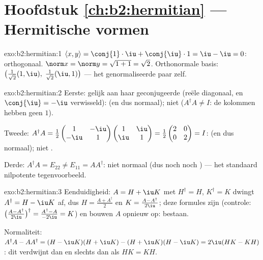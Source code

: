 \section*{Hoofdstuk \ref{ch:b2:hermitian} --- Hermitische vormen}

\begin{solution}{exo:b2:hermitian:1}
$\langle x, y\rangle = \conj{1}\cdot\iu + \conj{\iu}\cdot 1 = \iu -
\iu = 0$: orthogonaal. $\norm x = \norm y = \sqrt{1 + 1} =
\sqrt2$. Orthonormale basis: $\bigl(\frac{1}{\sqrt2}(1, \iu),\;
\frac{1}{\sqrt2}(\iu, 1)\bigr)$ --- het genormaliseerde paar zelf.
\end{solution}

\begin{solution}{exo:b2:hermitian:2}
Eerste: gelijk aan haar geconjugeerde  (reële
diagonaal, en $\conj{\iu} = -\iu$ verwisseld):  (en dus
normaal); niet  ($A^\dagger A \neq I$: de kolommen hebben
geen  $1$).

Tweede: $A^\dagger A = \frac12\begin{pmatrix} 1 & -\iu\\ -\iu &
1\end{pmatrix}\begin{pmatrix} 1 & \iu\\ \iu & 1\end{pmatrix} =
\frac12\begin{pmatrix} 2 & 0\\ 0 & 2\end{pmatrix} = I$:  (en
dus normaal); niet .

Derde: $A^\dagger A = E_{22} \neq E_{11} = AA^\dagger$: niet
normaal (dus noch  noch ) --- het standaard
nilpotente tegenvoorbeeld.
\end{solution}

\begin{solution}{exo:b2:hermitian:3}
Eenduidigheid: $A = H + \iu K$ met $H^\dagger = H$, $K^\dagger = K$
dwingt $A^\dagger = H - \iu K$ af, dus $H = \frac{A +
A^\dagger}{2}$ en $K = \frac{A - A^\dagger}{2\iu}$; deze formules
zijn  (controle: $\bigl(\frac{A -
A^\dagger}{2\iu}\bigr)^\dagger = \frac{A^\dagger - A}{-2\iu} = K$)
en bouwen $A$ opnieuw op: bestaan.

Normaliteit: $A^\dagger A - AA^\dagger = (H - \iu K)(H + \iu K) -
(H + \iu K)(H - \iu K) = 2\iu(HK - KH)$: dit verdwijnt dan en
slechts dan als $HK = KH$.
\end{solution}

